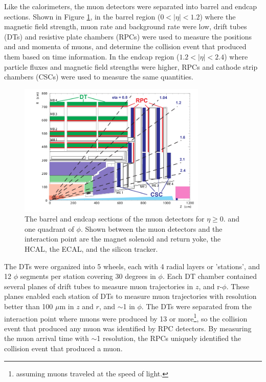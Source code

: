 Like the calorimeters, the muon detectors were separated into barrel and endcap sections.  Shown in Figure \ref{fig:muonBarrelAndEndcapDetectors}, in the barrel 
region ($0 < |\eta| < 1.2$) where the magnetic field strength, muon rate and background rate were low, drift 
tubes (DTs) and resistive plate chambers (RPCs) were used to measure the positions and 
and momenta of muons, and determine the collision event that produced them based on time information.  In the endcap 
region ($1.2 < |\eta| < 2.4$) where particle fluxes and magnetic field strengths were higher, RPCs and cathode 
strip chambers (CSCs) were used to measure the same quantities.

\begin{figure}[ht]
	\centering
	\includegraphics[width=0.8\textwidth]{figures/muonDetectorLayout.png}
	\caption{The barrel and endcap sections of the muon detectors for $\eta \geq 0.$ and one quadrant of $\phi$.  Shown 
		between the muon detectors and the interaction point are the magnet solenoid and return yoke, the HCAL, the ECAL, 
		and the silicon tracker.}
	\label{fig:muonBarrelAndEndcapDetectors}
\end{figure}


The DTs were organized into 5 wheels, each with 4 radial layers or 'stations', and 12 $\phi$ segments per 
station covering 30 degrees in $\phi$.  Each DT chamber contained several planes of drift tubes to measure 
muon trajectories in $z$, and r-$\phi$.  These planes enabled each station of DTs to measure muon trajectories 
with resolution better than 100 $\mu$m in $z$ and $r$, and $\sim$1 \mrad in $\phi$.  The DTs were separated 
from the interaction point where muons were produced by 13 \ns or more\footnote{assuming muons traveled at the speed 
of light.}, so the collision event that produced any muon was identified by RPC detectors.  By measuring 
the muon arrival time with $\sim$1 \ns resolution, the RPCs uniquely identified the collision event that 
produced a muon.

